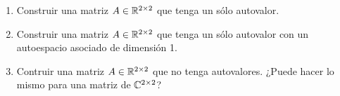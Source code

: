 \item \begin{enumerate}
        \item Construir una matriz $A\in\mathbb{R}^{2\times2}$ que tenga un sólo autovalor.
            \begin{mdframed}[style=s]
                
            \end{mdframed}
        \item Construir una matriz $A\in\mathbb{R}^{2\times2}$ que tenga un sólo autovalor con un autoespacio asociado de dimensión 1.
            \begin{mdframed}[style=s]
                
            \end{mdframed}
        \item Contruir una matriz $A\in\mathbb{R}^{2\times2}$ que no tenga autovalores. ¿Puede hacer lo mismo para una matriz de $\mathbb{C}^{2\times2}$?
            \begin{mdframed}[style=s]
                
            \end{mdframed}
    \end{enumerate}